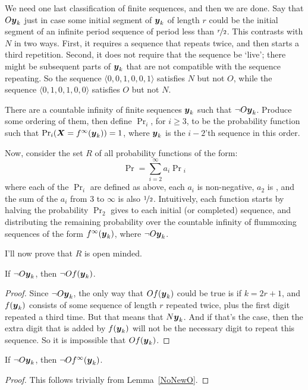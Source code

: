 We need one last classification of finite sequences, and then we are done. Say that $O\boldsymbol{y}_k$ just in case some initial segment of $\boldsymbol{y}_k$ of length $r$ could be the initial segment of an infinite period sequence of period less than $\nicefrac{r}{2}$. This contrasts with $N$ in two ways. First, it requires a sequence that repeats twice, and then starts a third repetition. Second, it does not require that the sequence be `live'; there might be subsequent parts of $\boldsymbol{y}_k$ that are not compatible with the sequence repeating. So the sequence $\langle 0, 0, 1, 0, 0, 1\rangle$ satisfies $N$ but not $O$, while the sequence $\langle 0, 1, 0, 1, 0, 0\rangle$ satisfies $O$ but not $N$.

There are a countable infinity of finite sequences $\boldsymbol{y}_k$ such that $\neg O \boldsymbol{y}_k$. Produce some ordering of them, then define $\Pr_i$, for $i \geq 3$, to be the probability function such that $\Pr_i(\boldsymbol{X} = f^\infty(\boldsymbol{y}_k)) = 1$, where $\boldsymbol{y}_k$ is the $i-2$'th sequence in this order.

Now, consider the set $R$ of all probability functions of the form:
\begin{equation}
\Pr = \sum_{i = 2}^\infty a_i\Pr{}_i
\end{equation}
%
\noindent where each of the $\Pr_i$ are defined as above, each $a_i$ is non-negative, $a_2$ is , and the sum of the $a_i$ from 3 to $\infty$ is also $\nicefrac{1}{2}$. Intuitively, each function starts by halving the probability $\Pr_2$ gives to each initial (or completed) sequence, and distributing the remaining probability over the countable infinity of flummoxing sequences of the form $f^\infty(\boldsymbol{y}_k)$, where $\neg O\boldsymbol{y}_k$.

I'll now prove that $R$ is open minded.

\begin{lemma}
\label{NoNewO}
If $\neg O \boldsymbol{y}_k$, then $\neg O f(\boldsymbol{y}_k)$.
\end{lemma}
\begin{proof}
Since $\neg O \boldsymbol{y}_k$, the only way that $O f(\boldsymbol{y}_k)$ could be true is if $k = 2r +1$, and $f(\boldsymbol{y}_k)$ consists of some sequence of length $r$ repeated twice, plus the first digit repeated a third time. But that means that $N\boldsymbol{y}_k$. And if that's the case, then the extra digit that is added by $f(\boldsymbol{y}_k)$ will not be the necessary digit to repeat this sequence. So it is impossible that $O f(\boldsymbol{y}_k)$.
\end{proof}
\begin{lemma}
\label{StillNoNewO}
If $\neg O \boldsymbol{y}_k$, then $\neg O f^\infty(\boldsymbol{y}_k)$.
\end{lemma}
\begin{proof}
This follows trivially from Lemma~\ref{NoNewO}.
\end{proof}

